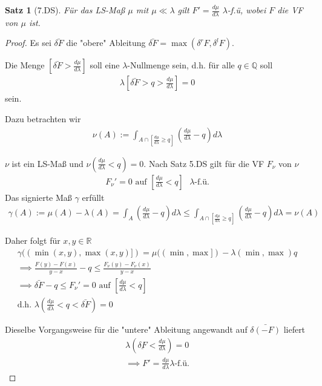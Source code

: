 \documentclass[]{article}
\newtheorem{theorem}{Satz}
\begin{document}
\begin{theorem}[7.DS]
	Für das LS-Maß $\mu$ mit $\mu \ll \lambda$ gilt $F' = \frac{d\mu}{d\lambda}$ $\lambda$-f.ü, wobei $F$ die VF von $\mu$ ist.
\end{theorem}
\begin{proof}
	Es sei $\bar{\delta F}$ die "obere" Ableitung $\bar{\delta F} = \max (\delta^r F, \delta^l F)$.
	
	Die Menge $[\bar{\delta F} > \frac{d\mu}{d\lambda}]$ soll eine $\lambda$-Nullmenge sein, d.h. für alle $q\in \mathbb{Q}$ soll
	\begin{align*}
		\lambda [\bar{\delta F} > q > \frac{d\mu}{d\lambda}] = 0
	\end{align*}
	sein.
	
	Dazu betrachten wir
	\begin{align*}
		\nu(A) := \int_{A\cap [\frac{d\mu}{d\lambda} \geq q]} \left(\frac{d\mu}{d\lambda} - q\right) d\lambda
	\end{align*}

	$\nu$ ist ein LS-Maß und $\nu(\frac{d\mu}{d\lambda} < q) = 0$.
	Nach Satz 5.DS gilt für die VF $F_\nu$ von $\nu$
	\begin{align*}
		F_\nu' = 0 \text{ auf } [\frac{d\mu}{d\lambda} < q] \text{ } \lambda\text{-f.ü.}
	\end{align*}
	Das signierte Maß $\gamma$ erfüllt
	\begin{align*}
		\gamma(A) := \mu(A) - \lambda(A) = \int_A \left(\frac{d\mu}{d\lambda} - q\right) d\lambda \leq \int_{A\cap [\frac{d\mu}{d\lambda} \geq q]} (\frac{d\mu}{d\lambda} - q) d\lambda = \nu(A)
	\end{align*}

	Daher folgt für $x,y \in \mathbb{R}$
	\begin{align*}
		\gamma((\min(x,y), \max(x,y)]) = \mu((\min, \max]) - \lambda(\min, \max) q\\
		\implies \frac{F(y)-F(x)}{y-x} - q \leq \frac{F_\nu(y) - F_\nu(x)}{y-x}\\
		\implies \bar{\delta F} - q \leq F_\nu' = 0 \text{ auf } [\frac{d\mu}{d\lambda} < q]\\
		\text{d.h. } \lambda\left( \frac{d\mu}{d\lambda} < q < \bar{\delta F} \right) = 0
	\end{align*}
	
	Dieselbe Vorgangsweise für die "untere" Ableitung angewandt auf $\bar{\delta (-F)}$ liefert
	\begin{align*}
		\lambda \left( \underline{\delta F} < \frac{d\mu}{d\lambda} \right) = 0\\
		\implies F' = \frac{d\mu}{d\lambda} \lambda\text{-f.ü.}
	\end{align*}
\end{proof}
\end{document}
